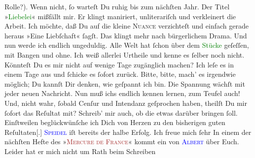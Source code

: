                Rolle?). Wenn nicht, ſo warteſt Du ruhig bis zum nächſten Jahr. Der Titel »\textcolor{green}{Liebelei}{}\ledrightnote{\textcolor{green}{Liebelei. Schauspiel in drei Akten}}« mißfällt mir. {\pb}Er klingt maniriert, unliterariſch und verkleinert
               die Arbeit. Ich möchte, daß Du auf die kleine \textsc{Nuance}
               verzichteſt und einfach gerade heraus »Eine Liebſchaft« ſagſt. Das klingt mehr nach
               bürgerlichem Drama. Und nun werde ich endlich ungeduldig. Alle Welt hat ſchon über
               dem \textcolor{green}{Stücke}{} geſeſſen, mit  Bangen und ohne. Ich weiß allerlei Urtheile und kenne
               es ſelber noch nicht. Könnteſt Du es mir nicht auf wenige Tage zugänglich machen? Ich
               leſe es in einem Tage aus und ſchicke es ſofort zurück. Bitte, bitte, mach’ es
               irgendwie möglich; Du kannſt Dir denken, wie geſpannt {\pb}ich bin. Die Spannung wächſt mit jeder neuen
               Nachricht. Nun muß ichs endlich kennen lernen, zum Teufel auch! Und, nicht wahr,
               ſobald Cenſur und Intendanz geſprochen haben, theilſt Du mir ſofort das Reſultat mit?
               Schreib’ mir auch, ob die \label{K_L02630-3v}\label{K_L02630-3h} etwas darüber bringen ſoll. Einſtweilen
               beglückwünſche ich Dich von Herzen zu den bisherigen guten
                  Reſultaten{[}.{]}{ }\textsc{\textcolor{blue}{Speidel}{}\ledrightnote{\textcolor{blue}{Ludwig Speidel}}} iſt bereits der
               halbe Erfolg. Ich freue mich ſehr{\dotsfive}\pend
           \pstart
           In einem der nächſten Hefte des »\textsc{\textcolor{brown}{Mercure de France}{}\ledrightnote{\textcolor{brown}{Mercure de France}}}« kommt ein \label{K_L02630-12v}\label{K_L02630-12h} von
                  \textsc{\textcolor{blue}{Albert}{}\ledrightnote{\textcolor{blue}{Henri Albert}}} über Euch.
               Leider hat er mich nicht um Rath {\pb}beim Schreiben
